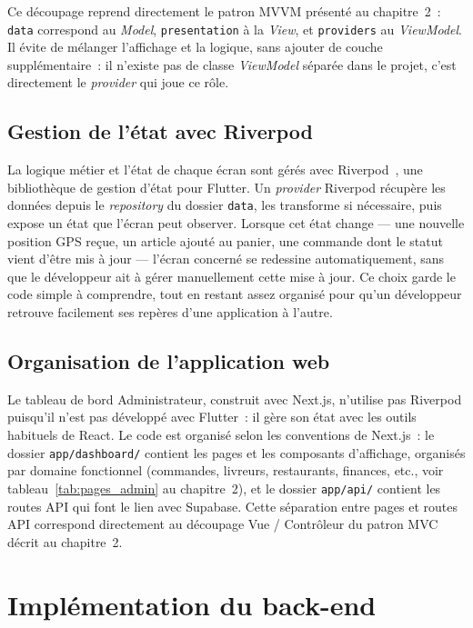 \documentclass[12pt,fleqn,a4paper]{report}
\begin{document}
\begin{justify}
Ce découpage reprend directement le patron MVVM présenté au chapitre~2~: \texttt{data} correspond au \textit{Model}, \texttt{presentation} à la \textit{View}, et \texttt{providers} au \textit{ViewModel}. Il évite de mélanger l'affichage et la logique, sans ajouter de couche supplémentaire~: il n'existe pas de classe \textit{ViewModel} séparée dans le projet, c'est directement le \textit{provider} qui joue ce rôle.

\subsection{Gestion de l'état avec Riverpod}

La logique métier et l'état de chaque écran sont gérés avec Riverpod~\cite{riverpod_docs}, une bibliothèque de gestion d'état pour Flutter. Un \textit{provider} Riverpod récupère les données depuis le \textit{repository} du dossier \texttt{data}, les transforme si nécessaire, puis expose un état que l'écran peut observer. Lorsque cet état change — une nouvelle position GPS reçue, un article ajouté au panier, une commande dont le statut vient d'être mis à jour — l'écran concerné se redessine automatiquement, sans que le développeur ait à gérer manuellement cette mise à jour. Ce choix garde le code simple à comprendre, tout en restant assez organisé pour qu'un développeur retrouve facilement ses repères d'une application à l'autre.

\subsection{Organisation de l'application web}

Le tableau de bord Administrateur, construit avec Next.js, n'utilise pas Riverpod puisqu'il n'est pas développé avec Flutter~: il gère son état avec les outils habituels de React. Le code est organisé selon les conventions de Next.js~: le dossier \texttt{app/dashboard/} contient les pages et les composants d'affichage, organisés par domaine fonctionnel (commandes, livreurs, restaurants, finances, etc., voir tableau~\ref{tab:pages_admin} au chapitre~2), et le dossier \texttt{app/api/} contient les routes API qui font le lien avec Supabase. Cette séparation entre pages et routes API correspond directement au découpage Vue / Contrôleur du patron MVC décrit au chapitre~2.

\section{Implémentation du back-end}


\end{justify}
\end{document}
